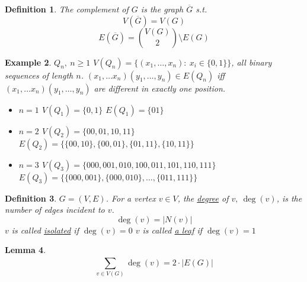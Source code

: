 \documentclass[a4paper]{article}
\theoremstyle{plain}
\newtheorem{lemma}{Lemma}
\newtheorem{definition}[lemma]{Definition}
\theoremstyle{myremark}
\newtheorem{example}[lemma]{Example}
\begin{document}
\begin{definition}
The complement of $G$ is the graph $\overline{G}$ s.t.
$$
V(\overline{G})=V(G)
$$
$$
E(\overline{G})= {V(G)\choose 2}\setminus E(G)
$$
\end{definition}

\begin{example}
$Q_n,\ n\geq 1$\newline
$V(Q_n)=\{(x_1,\dots,x_n):\ x_i\in\{0,1\}\}$, all binary sequences of length $n$.\newline
$(x_1,\dots x_n)(y_1,\dots,y_n)\in E(Q_n)$ iff $(x_1,\dots x_n)(y_1,\dots,y_n)$ are different in exactly one position.\newline
\begin{itemize}
    \item $n=1$\newline
    $V(Q_1)=\{0,1\}$\newline
    $E(Q_1)=\{01\}$
    \item $n=2$\newline
    $V(Q_2)=\{00,01,10,11\}$\newline
    $E(Q_2)=\{\{00,10\},\{00,01\},\{01,11\},\{10,11\}\}$
    \item $n=3$\newline
    $V(Q_3)=\{000,001,010,100,011,101,110,111\}$\newline
    $E(Q_3)=\{\{000,001\},\{000,010\},\dots,\{011,111\}\}$
\end{itemize}
\end{example}

\begin{definition}
$G=(V,E)$. For a vertex $v\in V$, the \underline{degree} of $v,\ \deg(v)$, is the number of edges incident to $v$.
$$
\deg(v) = |N(v)|
$$
$v$ is called \underline{isolated} if $\deg(v)=0$\newline
$v$ is called \underline{a leaf} if $\deg(v)=1$
\end{definition}

\begin{lemma}
$$
\sum_{v\in V(G)}^{} \deg(v)=2\cdot|E(G)|
$$
\end{lemma}
\end{document}
